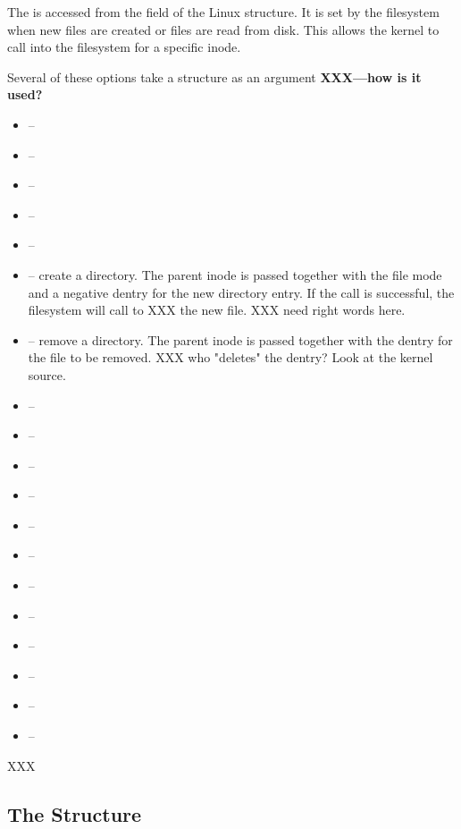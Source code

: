 The  is accessed from the  field of the Linux  structure. It is set by the filesystem when new files are created or files are read from disk. This allows the kernel to call into the filesystem for a specific inode.

Several of these options take a  structure as an argument \textbf{XXX---how is it used?}

\begin{itemize}
    \item {} -- 
    \item {} -- 
    \item {} -- 
    \item {} -- 
    \item {} -- 
    \item {} -- create a directory. The parent inode is passed together with the file mode and a negative dentry for the 
    	new directory entry. If the call is successful, the filesystem will call  to XXX the new file. XXX need right 
	words here.
    \item {} -- remove a directory. The parent inode is passed together with the dentry for the file to be removed. XXX who
    	"deletes" the dentry? Look at the kernel source.
    \item {} -- 
    \item {} -- 
    \item {} -- 
    \item {} -- 
    \item {} -- 
    \item {} -- 
    \item {} -- 
    \item {} -- 
    \item {} -- 
    \item {} -- 
    \item {} -- 
    \item {} -- 
\end{itemize}

\noindent
XXX


\subsection{The  Structure}

